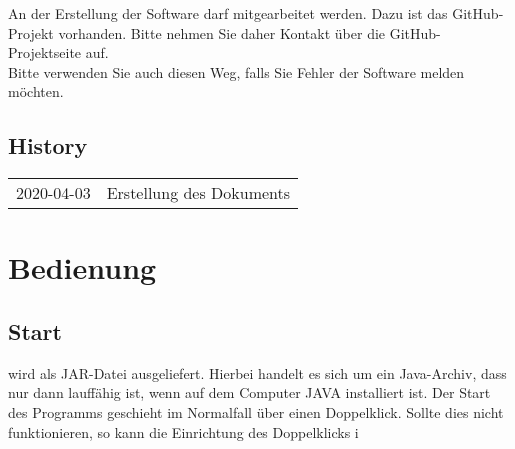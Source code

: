 \documentclass[12pt]{scrartcl}
\begin{document}
An der Erstellung der Software darf mitgearbeitet werden. Dazu ist das GitHub-Projekt vorhanden. Bitte nehmen Sie daher Kontakt über die GitHub-Projektseite auf.\\

Bitte verwenden Sie auch diesen Weg, falls Sie Fehler der Software melden möchten.\\

\subsection{History}
\begin{tabular}{p{4cm}p{10cm}}
2020-04-03 & Erstellung des Dokuments\\
\end{tabular}

\section{Bedienung}

\subsection{Start}
\lsN{} wird als JAR-Datei ausgeliefert. Hierbei handelt es sich um ein Java-Archiv, dass nur dann lauffähig ist, wenn auf dem Computer JAVA installiert ist. Der Start des Programms geschieht im Normalfall über einen Doppelklick. Sollte dies nicht funktionieren, so kann die Einrichtung des Doppelklicks i
\end{document}
